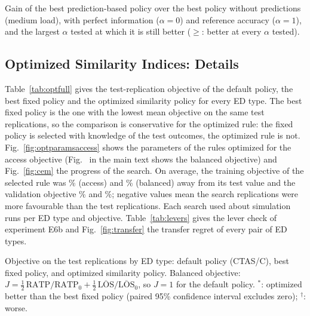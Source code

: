 \begin{table}[!htbp]
\centering
\caption{Gain of the best prediction-based policy over the best policy without predictions (medium load), with perfect information ($\alpha=0$) and reference accuracy ($\alpha=1$), and the largest $\alpha$ tested at which it is still better ($\geq$: better at every $\alpha$ tested).}
\label{tab:vop}
\footnotesize
\setlength{\tabcolsep}{2.5pt}
\begin{adjustbox}{max width=\linewidth}\end{adjustbox}
\end{table}

\subsection{Optimized Similarity Indices: Details}
\label{app:res:opt}

Table~\ref{tab:optfull} gives the test-replication objective of the default policy, the best fixed policy and the optimized similarity policy for every ED type. The best fixed policy is the one with the lowest mean objective on the same test replications, so the comparison is conservative for the optimized rule: the fixed policy is selected with knowledge of the test outcomes, the optimized rule is not. Fig.~\ref{fig:optparamsaccess} shows the parameters of the rules optimized for the access objective (Fig.~ in the main text shows the balanced objective) and Fig.~\ref{fig:cem} the progress of the search. On average, the training objective of the selected rule was \OptAccessTrainOptimism\% (access) and \OptBalancedTrainOptimism\% (balanced) away from its test value and the validation objective \OptAccessValOptimism\% and \OptBalancedValOptimism\%; negative values mean the search replications were more favourable than the test replications. Each search used about \CemEvalsPerType{} simulation runs per ED type and objective. Table~\ref{tab:levers} gives the lever check of experiment E6b and Fig.~\ref{fig:transfer} the transfer regret of every pair of ED types.

\begin{table}[!t]
\centering
\caption{Objective on the \Reps{} test replications by ED type: default policy (CTAS/C), best fixed policy, and optimized similarity policy. Balanced objective: $J=\tfrac12\,\text{RATP}/\text{RATP}_0+\tfrac12\,\overline{\text{LOS}}/\overline{\text{LOS}}_0$, so $J=1$ for the default policy. $^{*}$: optimized better than the best fixed policy (paired 95\% confidence interval excludes zero); $^{\dagger}$: worse.}
\label{tab:optfull}
\scriptsize
\setlength{\tabcolsep}{3pt}
\begin{adjustbox}{max width=\linewidth}\end{adjustbox}
\end{table}

